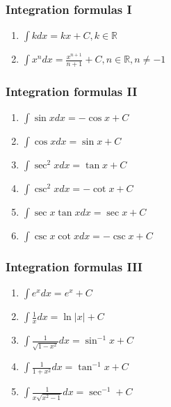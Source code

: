 \documentclass[
]{article}
\begin{document}
\hypertarget{integration-formulas-i}{%
\subsubsection{Integration formulas I}\label{integration-formulas-i}}

\begin{enumerate}
\def\labelenumi{\arabic{enumi}.}
\item
  \(\int kdx = kx + C, k \in \mathbb{R}\)
\item
  \(\int x^ndx = \frac{x^{n+1}}{n+1}+C, n \in \mathbb{R}, n \neq -1\)
\end{enumerate}

\hypertarget{integration-formulas-ii}{%
\subsubsection{Integration formulas II}\label{integration-formulas-ii}}

\begin{enumerate}
\def\labelenumi{\arabic{enumi}.}
\item
  \(\int \sin xdx = -\cos x + C\)
\item
  \(\int \cos xdx = \sin x + C\)
\item
  \(\int \sec^2xdx = \tan x + C\)
\item
  \(\int \csc^2xdx = -\cot x + C\)
\item
  \(\int \sec x\tan xdx = \sec x + C\)
\item
  \(\int \csc x\cot xdx = -\csc x +C\)
\end{enumerate}

\hypertarget{integration-formulas-iii}{%
\subsubsection{Integration formulas
III}\label{integration-formulas-iii}}

\begin{enumerate}
\def\labelenumi{\arabic{enumi}.}
\item
  \(\int e^xdx =e^x +C\)
\item
  \(\int \frac{1}{x}dx=\ln|x|+C\)
\item
  \(\int \frac{1}{\sqrt{1-x^2}}dx = \sin^{-1}x +C\)
\item
  \(\int \frac{1}{1+x^2}dx = \tan^{-1}x +C\)
\item
  \(\int \frac{1}{x\sqrt{x^2-1}}dx= \sec^{-1}+C\)
\end{enumerate}
\end{document}
